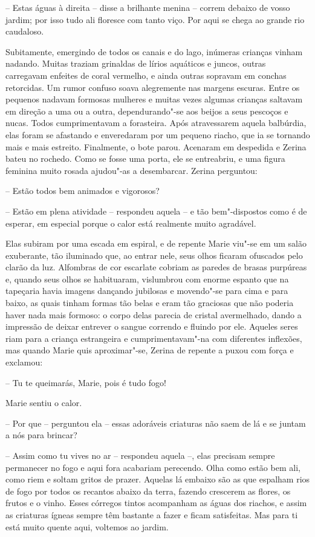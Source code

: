 -- Estas águas à direita -- disse a brilhante menina -- correm debaixo
de vosso jardim; por isso tudo ali floresce com tanto viço. Por aqui se
chega ao grande rio caudaloso.

Subitamente, emergindo de todos os canais e do lago, inúmeras crianças
vinham nadando. Muitas traziam grinaldas de lírios aquáticos e juncos,
outras carregavam enfeites de coral vermelho, e ainda outras sopravam
em conchas retorcidas. Um rumor confuso soava alegremente nas margens
escuras. Entre os pequenos nadavam formosas mulheres e muitas vezes
algumas crianças saltavam em direção a uma ou a outra, dependurando"-se
aos beijos a seus pescoços e nucas. Todos cumprimentavam a forasteira.
Após atravessarem aquela balbúrdia, elas foram se afastando e
enveredaram por um pequeno riacho, que ia se tornando mais e mais
estreito. Finalmente, o bote parou. Acenaram em despedida e Zerina
bateu no rochedo. Como se fosse uma porta, ele se entreabriu, e uma
figura feminina muito rosada ajudou"-as a desembarcar. Zerina perguntou:

-- Estão todos bem animados e vigorosos?

-- Estão em plena atividade -- respondeu aquela -- e tão bem"-dispostos
como é de esperar, em especial porque o calor está realmente muito agradável. 

Elas subiram por uma escada em espiral, e de repente Marie viu"-se em um
salão exuberante, tão iluminado que, ao entrar nele, seus
olhos ficaram ofuscados pelo clarão da luz. Alfombras de cor escarlate
cobriam as paredes de brasas purpúreas e, quando seus olhos se
habituaram, vislumbrou com enorme espanto que na tapeçaria havia imagens
dançando jubilosas e movendo"-se para cima e para baixo, as quais tinham
formas tão belas e eram tão graciosas que não poderia haver nada mais
formoso: o corpo delas parecia de cristal avermelhado, dando a impressão de
deixar entrever o sangue correndo e fluindo por ele. Aqueles seres riam
para a criança estrangeira e cumprimentavam"-na com diferentes
inflexões, mas quando Marie quis aproximar"-se, Zerina de repente a
puxou com força e exclamou:

-- Tu te queimarás, Marie, pois é tudo fogo!

Marie sentiu o calor.

-- Por que -- perguntou ela -- essas adoráveis criaturas não saem de lá
e se juntam a nós para brincar?

-- Assim como tu vives no ar -- respondeu aquela \mbox{--,} elas precisam
sempre permanecer no fogo e aqui fora acabariam perecendo. Olha como
estão bem ali, como riem e soltam gritos de prazer. Aquelas lá embaixo
são as que espalham rios de fogo por todos os recantos abaixo da
terra, fazendo crescerem as flores, os frutos e o vinho. Esses córregos
tintos acompanham as águas dos riachos, e assim as criaturas ígneas
sempre têm bastante a fazer e ficam satisfeitas. Mas para ti está muito
quente aqui, voltemos ao jardim.

